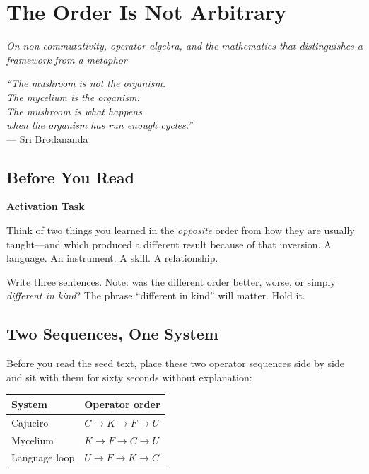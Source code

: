 \documentclass[11pt, twoside, openright]{book}
\theoremstyle{plain}
\theoremstyle{definition}
\newenvironment{activationbox}{%
  \begin{mdframed}[backgroundcolor=AlertBox,linecolor=orange!70,linewidth=0.5pt,innertopmargin=6pt,innerbottommargin=6pt]
  \noindent\textbf{Activation Task}\par\medskip}{\end{mdframed}}
\begin{document}
\chapter{The Order Is Not Arbitrary}
\textit{On non-commutativity, operator algebra, and the mathematics
that distinguishes a framework from a metaphor}

\begin{flushright}
\textit{``The mushroom is not the organism.\\
The mycelium is the organism.\\
The mushroom is what happens\\
when the organism has run enough cycles.''}\\
--- Sri Brodananda
\end{flushright}

\section{Before You Read}

\begin{activationbox}
Think of two things you learned in the \textit{opposite} order from how they
are usually taught---and which produced a different result because of
that inversion. A language. An instrument. A skill. A relationship.

Write three sentences. Note: was the different order better, worse,
or simply \textit{different in kind}? The phrase ``different in kind'' will matter.
Hold it.
\end{activationbox}

\section{Two Sequences, One System}
Before you read the seed text, place these two operator sequences
side by side and sit with them for sixty seconds without explanation:

\medskip
\begin{center}
\begin{tabular}{@{}ll@{}}
\toprule
\textbf{System} & \textbf{Operator order} \\
\midrule
Cajueiro       & $C \to K \to F \to U$ \\
Mycelium       & $K \to F \to C \to U$ \\
Language loop  & $U \to F \to K \to C$ \\
\bottomrule
\end{tabular}
\end{center}
\end{document}
